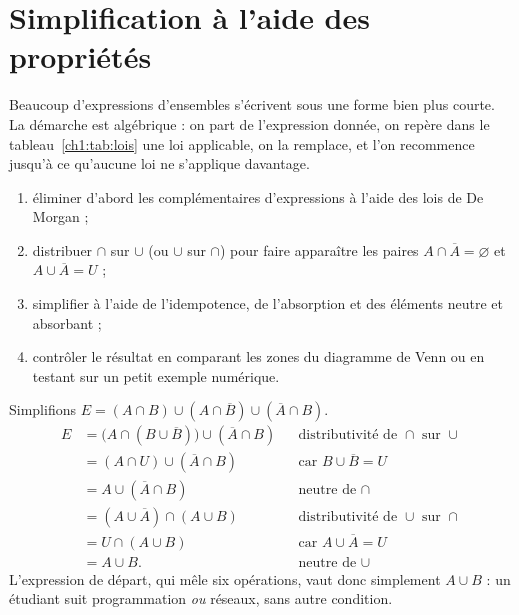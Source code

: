 \section{Simplification à l'aide des propriétés}

Beaucoup d'expressions d'ensembles s'écrivent sous une forme bien plus courte. La démarche est algébrique : on part de l'expression donnée, on repère dans le tableau~\ref{ch1:tab:lois} une loi applicable, on la remplace, et l'on recommence jusqu'à ce qu'aucune loi ne s'applique davantage.

\begin{methode}
\begin{enumerate}
  \item éliminer d'abord les complémentaires d'expressions à l'aide des lois de De Morgan ;
  \item distribuer $\cap$ sur $\cup$ (ou $\cup$ sur $\cap$) pour faire apparaître les paires $A \cap \overline{A} = \varnothing$ et $A \cup \overline{A} = U$ ;
  \item simplifier à l'aide de l'idempotence, de l'absorption et des éléments neutre et absorbant ;
  \item contrôler le résultat en comparant les zones du diagramme de Venn ou en testant sur un petit exemple numérique.
\end{enumerate}
\end{methode}

\begin{exemple}
Simplifions $E = (A \cap B) \cup (A \cap \overline{B}) \cup (\overline{A} \cap B)$.
\begin{align*}
E &= \bigl(A \cap (B \cup \overline{B})\bigr) \cup (\overline{A} \cap B)
   && \text{distributivité de } \cap \text{ sur } \cup\\
  &= (A \cap U) \cup (\overline{A} \cap B)
   && \text{car } B \cup \overline{B} = U\\
  &= A \cup (\overline{A} \cap B)
   && \text{neutre de } \cap\\
  &= (A \cup \overline{A}) \cap (A \cup B)
   && \text{distributivité de } \cup \text{ sur } \cap\\
  &= U \cap (A \cup B)
   && \text{car } A \cup \overline{A} = U\\
  &= A \cup B .
   && \text{neutre de } \cup
\end{align*}
L'expression de départ, qui mêle six opérations, vaut donc simplement $A \cup B$ : un étudiant suit programmation \emph{ou} réseaux, sans autre condition.
\end{exemple}

